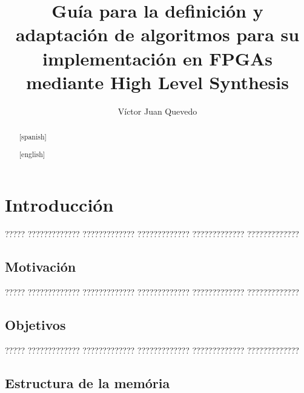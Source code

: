 \documentclass[11pt,catalan,listoffigures,listoftables]{tfgetsinf}
\title{Guía para la definición y adaptación de algoritmos para su implementación en FPGAs mediante High Level Synthesis}
\author{Víctor Juan Quevedo}
\begin{document}

\begin{abstract}
   
\end{abstract}

\begin{abstract}[spanish]
\end{abstract}

\begin{abstract}[english]
\end{abstract}


\mainmatter


\chapter{Introducci\'on}

????? ????????????? ????????????? ????????????? ????????????? ?????????????

\section{Motivaci\'on}

????? ????????????? ????????????? ????????????? ????????????? ?????????????

\section{Objetivos}

????? ????????????? ????????????? ????????????? ????????????? ?????????????

\section{Estructura de la mem\'oria}
\end{document}
